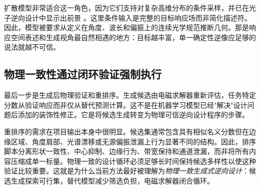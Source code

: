 扩散模型非常适合这一角色，因为它们支持对复杂高维分布的条件采样，并已在光子逆向设计中显示出前景 \cite{liu2018,so2019,ma2021,tanriover2023,zhang2023,zhang2024,hen2026}。这里条件输入是完整的目标响应场而非简化描述符。因此，模型被要求从定义在角度、波长和偏振上的连续光学规范推断几何。那是响应空间表述和生成视角最自然相遇的地方：目标越丰富，单一确定性逆像应足够的说法就越不可信。

\subsection{物理一致性通过闭环验证强制执行}

最后一步是生成后物理验证和重排序。生成候选由电磁求解器重新评估，任务特定分数从验证响应而非仅从替代预测计算。这不是在机器学习模型已经"解决"设计问题后添加的装饰性修正。它是将候选生成转变为物理可信逆向设计程序的步骤。

重排序的需求在项目输出本身中很明显。候选集通常包含具有相似名义分数但在边缘区域、角度肩部、光谱漂移或无源偏振泄漏上行为显著不同的结构。因此，排序脚本分离形状一致性、中心抑制、边缘行为、带宽保持和通道泄漏，而非将所有内容压缩成单一标量。物理一致的设计循环必须足够长时间保持候选多样性以使这种验证比较重要。这就是为什么当前方法最好被理解为\emph{物理一致生成式逆向设计}：候选生成探索可行集，替代模型减少筛选负担，电磁求解器闭合循环。
